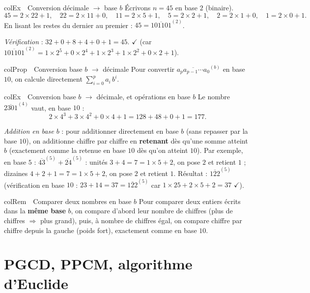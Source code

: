 \documentclass[11pt,a4paper]{article}
\newenvironment{propriete}[1][Propriété]
  {\begin{fiche}{colProp}{\ding{72}~~#1}}{\end{fiche}}
\newenvironment{exemple}[1][Exemple]
  {\begin{fiche}{colEx}{\ding{217}~~#1}}{\end{fiche}}
\newenvironment{remarque}[1][Remarque]
  {\begin{fiche}{colRem}{\ding{43}~~#1}}{\end{fiche}}
\begin{document}
\begin{exemple}[Conversion décimale $\to$ base $b$]
Écrivons $n=45$ en base $2$ (binaire).
\[
  45 = 2\times22+1, \quad 22=2\times11+0, \quad 11=2\times5+1, \quad 5=2\times2+1, \quad 2=2\times1+0, \quad 1=2\times0+1.
\]
En lisant les restes du dernier au premier : $45=\overline{101101}^{(2)}$.

\smallskip
\emph{Vérification} : $32+0+8+4+0+1=45$. $\checkmark$ (car $\overline{101101}^{(2)}=1\times2^5+0\times2^4+1\times2^3+1\times2^2+0\times2+1$).
\end{exemple}

\begin{propriete}[Conversion base $b$ $\to$ décimale]
Pour convertir $\overline{a_pa_{p-1}\cdots a_0}^{(b)}$ en base $10$, on calcule directement $\displaystyle\sum_{i=0}^pa_i\,b^i$.
\end{propriete}

\begin{exemple}[Conversion base $b$ $\to$ décimale, et opérations en base $b$]
Le nombre $\overline{2301}^{(4)}$ vaut, en base $10$ :
\[
  2\times4^3+3\times4^2+0\times4+1 = 128+48+0+1 = 177.
\]

\smallskip
\emph{Addition en base $b$} : pour additionner directement en base $b$ (sans repasser par la base $10$), on additionne chiffre par chiffre en \textbf{retenant} dès qu'une somme atteint $b$ (exactement comme la retenue en base $10$ dès qu'on atteint $10$). Par exemple, en base $5$ : $\overline{43}^{(5)}+\overline{24}^{(5)}$ : unités $3+4=7=1\times5+2$, on pose $2$ et retient $1$ ; dizaines $4+2+1=7=1\times5+2$, on pose $2$ et retient $1$. Résultat : $\overline{122}^{(5)}$ (vérification en base $10$ : $23+14=37=\overline{122}^{(5)}$ car $1\times25+2\times5+2=37$ $\checkmark$).
\end{exemple}

\begin{remarque}[Comparer deux nombres en base $b$]
Pour comparer deux entiers écrits dans la \textbf{même base} $b$, on compare d'abord leur nombre de chiffres (plus de chiffres $\Rightarrow$ plus grand), puis, à nombre de chiffres égal, on compare chiffre par chiffre depuis la gauche (poids fort), exactement comme en base $10$.
\end{remarque}

\section{PGCD, PPCM, algorithme d'Euclide}
\end{document}
